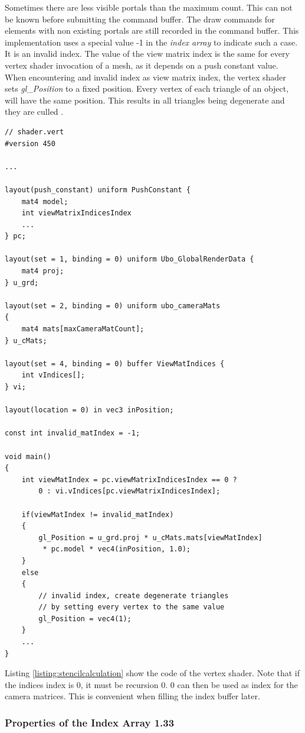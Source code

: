 Sometimes there are less visible portals than the maximum count. This can not be known before submitting the command buffer. The draw commands for elements with non existing portals are still recorded in the command buffer. This implementation uses a special value -1 in the \textit{index array} to indicate such a case. It is an invalid index. The value of the view matrix index is the same for every vertex shader invocation of a mesh, as it depends on a push constant value. When encountering and invalid index as view matrix index, the vertex shader sets \textit{gl\_Position} to a fixed position. Every vertex of each triangle of an object, will have the same position. This results in all triangles being degenerate and they are culled \cite{khronos:vulkan:spec1.1}.

\begin{lstlisting}[caption={View Matrix Selection}, label=listing:stencilcalculation]
// shader.vert
#version 450

...

layout(push_constant) uniform PushConstant {	
	mat4 model;
	int viewMatrixIndicesIndex
	...
} pc;

layout(set = 1, binding = 0) uniform Ubo_GlobalRenderData {
	mat4 proj;
} u_grd;

layout(set = 2, binding = 0) uniform ubo_cameraMats
{
	mat4 mats[maxCameraMatCount];
} u_cMats;

layout(set = 4, binding = 0) buffer ViewMatIndices {
	int vIndices[];
} vi;

layout(location = 0) in vec3 inPosition;

const int invalid_matIndex = -1;

void main()
{
	int viewMatIndex = pc.viewMatrixIndicesIndex == 0 ? 
		0 : vi.vIndices[pc.viewMatrixIndicesIndex];
	
	if(viewMatIndex != invalid_matIndex)
	{
		gl_Position = u_grd.proj * u_cMats.mats[viewMatIndex]
		 * pc.model * vec4(inPosition, 1.0);
	}
	else
	{
		// invalid index, create degenerate triangles
		// by setting every vertex to the same value
		gl_Position = vec4(1);
	}
	...
}

\end{lstlisting}

Listing \ref{listing:stencilcalculation} show the code of the vertex shader. Note that if the indices index is 0, it must be recursion 0. 0 can then be used as index for the camera matrices. This is convenient when filling the index buffer later.

\subsubsection{Properties of the Index Array 1.33}
\label{section:indexarrayproperties}


